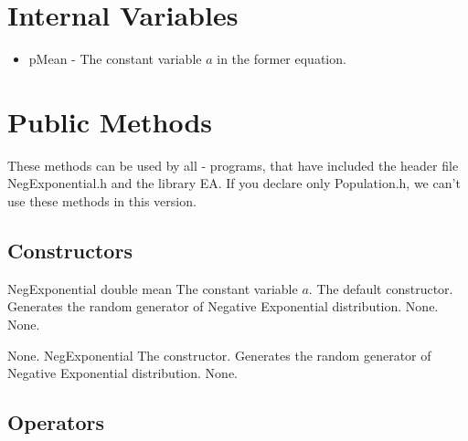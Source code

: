 \clearpage

\section{Internal Variables}

\begin{itemize}
\item pMean - The constant variable $a$ in the former equation.
\end{itemize}


\vspace*{5mm}

\section{Public Methods}

\noindent
These methods can be used by all \cpp - programs, that have included the
header file NegExponential.h and the library EA. If you declare only
Population.h, we can't use these methods in this version.

\subsection{Constructors}

\setNormalInstance
\printMethodWithOneParam
{}
{NegExponential}
{double}
{mean}
{The constant variable $a$.}
{The default constructor. Generates the random generator of Negative
Exponential distribution.}
{None.}
{None.}

\setNormalInstance
\setCorrectWidthThree{8pt}
\printMethodWithParamsSaved
{}
{None.}
{NegExponential}
{The constructor. Generates the random generator of Negative
Exponential distribution.}
{None.}
\setCorrectWidthThree{4pt}

\vspace*{5mm}

\subsection{Operators}

